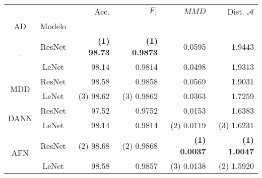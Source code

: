 \begin{table}[H]
    \centering
    \begin{tabular}{cc|rrrr}
        \toprule
                                 &        & Acc.                               & $F_1$                               & $MMD$                               & Dist. $\mathcal{A}$                 \\
        AD                       & Modelo &                                    &                                     &                                     &                                     \\
        \midrule
        \multirow[c]{2}{*}{-}    & ResNet & \textbf{{\footnotesize (1)} 98.73} & \textbf{{\footnotesize (1)} 0.9873} & 0.0595                              & 1.9443                              \\
                                 & LeNet  & 98.14                              & 0.9814                              & 0.0498                              & 1.9313                              \\\hline
        \multirow[c]{2}{*}{MDD}  & ResNet & 98.58                              & 0.9858                              & 0.0569                              & 1.9031                              \\
                                 & LeNet  & {\footnotesize (3)} 98.62          & {\footnotesize (3)} 0.9862          & 0.0363                              & 1.7259                              \\\hline
        \multirow[c]{2}{*}{DANN} & ResNet & 97.52                              & 0.9752                              & 0.0153                              & 1.6383                              \\
                                 & LeNet  & 98.14                              & 0.9814                              & {\footnotesize (2)} 0.0119          & {\footnotesize (3)} 1.6231          \\\hline
        \multirow[c]{2}{*}{AFN}  & ResNet & {\footnotesize (2)} 98.68          & {\footnotesize (2)} 0.9868          & \textbf{{\footnotesize (1)} 0.0037} & \textbf{{\footnotesize (1)} 1.0047} \\
                                 & LeNet  & 98.58                              & 0.9857                              & {\footnotesize (3)} 0.0138          & {\footnotesize (2)} 1.5920          \\\hline

\end{tabular}
\end{table}
